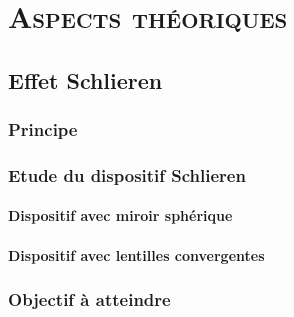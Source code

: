 \renewcommand{\chaptername}{\scshape Partie}
\chapter{\normalfont \scshape Aspects théoriques}
\section{Effet Schlieren}
\subsection{Principe}
\subsection{Etude du dispositif Schlieren}
\subsubsection{Dispositif avec miroir sphérique}
\subsubsection{Dispositif avec lentilles convergentes}
\subsection{Objectif à atteindre}
